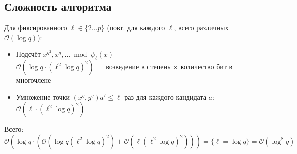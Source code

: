 \documentclass[12pt]{article}
\newcommand{\bigO}{\mathcal{O}}
\theoremstyle{definition}
\theoremstyle{definition}
\theoremstyle{definition}
\begin{document}
\subsection{Сложность алгоритма}

Для фиксированного $\ell\in\{2 \ldots p\}$ (повт. для каждого $\ell$, всего различных $\bigO(\log q)$):
\begin{itemize}
    \item Подсчёт $x^{q^2}, x^q, ... \bmod \psi_\ell(x)$\\
    $\bigO(\log q \cdot (\ell^2 \log q)^2) = $ возведение в степень $\times$ количество бит в многочлене
    
    \item Умножение точки $(x^q, y^q) a' \leq \ell$ раз для каждого кандидата $a:$\\
    $\bigO(\ell\cdot(\ell^2 \log q)^2)$
\end{itemize}
Всего: $\bigO(\log q \cdot(\bigO(\log q (\ell^2 \log q)^2) + \bigO(\ell(\ell^2 \log q)^2))) = \{\ell=\log q\} = \bigO(\log^8 q)$
\end{document}
